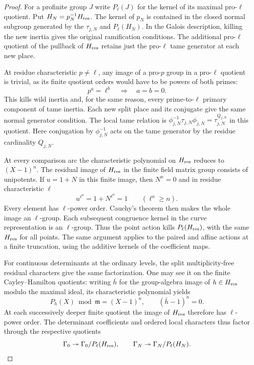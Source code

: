 \begin{proof}
For a profinite group \(J\) write \(P_\ell(J)\) for the
kernel of its maximal pro-\(\ell\) quotient. Put
\(H_N=p_N^{-1}H_{\rm res}\). The kernel of \(p_N\) is contained
in the closed normal subgroup generated by the
\(\tau_{j,N}\) and \(P_\ell(H_N)\). In the Galois description,
killing the new inertia gives the original ramification
conditions. The additional pro-\(\ell\) quotient of the
pullback of \(H_{\rm res}\) retains just the pro-\(\ell\) tame generator
at each new place.

At residue characteristic \(p\ne\ell\), any image of a pro-\(p\) group in a pro-\(\ell\) quotient is trivial, as its finite quotient orders would have to be powers of both primes:
\[
 p^a=\ell^b\quad\Longrightarrow\quad a=b=0 .
\]
This kills wild inertia and, for the same reason, every prime-to-\(\ell\) primary component of tame inertia. Each new split place and its
conjugate give the same normal generator condition.
The local tame relation is
\(\phi_{j,N}^{-1}\tau_{j,N}\phi_{j,N}=\tau_{j,N}^{Q_{j,N}}\)
in this quotient. Here conjugation by \(\phi_{j,N}^{-1}\) acts on the tame generator by the residue cardinality \(Q_{j,N}\).

At every comparison arc the characteristic polynomial on \(H_{\rm res}\)
reduces to \((X-1)^n\). The residual image of \(H_{\rm res}\) in the
finite field matrix group consists of unipotents. If \(u=1+N\) in this finite image, then \(N^n=0\) and in
residue characteristic \(\ell\)
\[
 u^{\ell^a}=1+N^{\ell^a}=1\qquad(\ell^a\ge n).
\]
Every element has \(\ell\)-power order. Cauchy's theorem then makes the
whole image an \(\ell\)-group. Each subsequent congruence kernel in
the curve representation is an \(\ell\)-group. Thus the point
action kills \(P_\ell(H_{\rm res})\), with the same \(H_{\rm res}\) for all points.
The same argument applies to the paired and affine actions at a
finite truncation, using the additive kernels of the coefficient
maps.

For continuous determinants at the ordinary levels,
the split multiplicity-free residual characters give the same
factorization. One may see it on the finite Cayley--Hamilton
quotients: writing \(\bar h\) for the group-algebra image of \(h\in H_{\rm res}\) modulo the maximal ideal, its characteristic polynomial yields 
\[
 P_h(X)\bmod\mathfrak m=(X-1)^n,\qquad (\bar h-1)^n=0.
\]
 At each successively deeper finite quotient the image
of \(H_{\rm res}\) therefore has \(\ell\)-power order. The determinant coefficients and ordered local characters thus factor through the respective quotients
\[
 \Gamma_0\twoheadrightarrow\Gamma_0/P_\ell(H_{\rm res}),\qquad \Gamma_N\twoheadrightarrow\Gamma_N/P_\ell(H_N).
\]
\label{cor:ordinary-patching-marking-1}


\end{proof}
